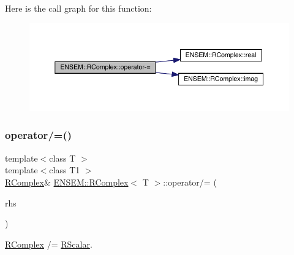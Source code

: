 Here is the call graph for this function\+:
\nopagebreak
\begin{figure}[H]
\begin{center}
\leavevmode
\includegraphics[width=350pt]{d9/d0e/classENSEM_1_1RComplex_aa2ad7391f0a0df5381ae7402b8b1fdb8_cgraph}
\end{center}
\end{figure}
\mbox{\label{classENSEM_1_1RComplex_ace62972244741ac0abcf1d3d1e833604}} 
\subsubsection{\texorpdfstring{operator/=()}{operator/=()}\hspace{0.1cm}{\footnotesize\ttfamily [1/4]}}
{\footnotesize\ttfamily template$<$class T $>$ \\
template$<$class T1 $>$ \\
\mbox{\hyperlink{classENSEM_1_1RComplex}{R\+Complex}}\& \mbox{\hyperlink{classENSEM_1_1RComplex}{E\+N\+S\+E\+M\+::\+R\+Complex}}$<$ T $>$\+::operator/= (\begin{DoxyParamCaption}\item[{const \mbox{\hyperlink{classENSEM_1_1RScalar}{R\+Scalar}}$<$ T1 $>$ \&}]{rhs }\end{DoxyParamCaption})\hspace{0.3cm}{\ttfamily [inline]}}



\mbox{\hyperlink{classENSEM_1_1RComplex}{R\+Complex}} /= \mbox{\hyperlink{classENSEM_1_1RScalar}{R\+Scalar}}. 

